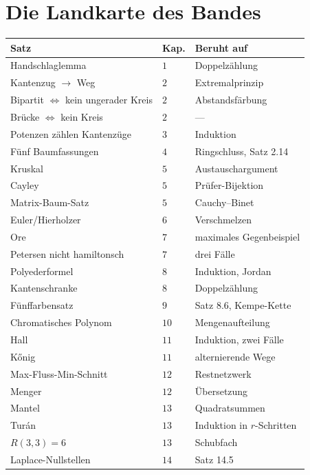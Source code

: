 \section{Die Landkarte des Bandes}

\begin{merksatz}
\begin{center}
{\small
\renewcommand{\arraystretch}{1.42}
\begin{tabular}{@{}P{3.4cm}P{1.4cm}P{3.4cm}@{}}
\toprule
\textbf{Satz} & \textbf{Kap.} & \textbf{Beruht auf}\\
\midrule
Handschlaglemma & $1$ & Doppelzählung\\
Kantenzug $\to$ Weg & $2$ & Extremalprinzip\\
Bipartit $\iff$ kein ungerader Kreis & $2$ & Abstandsfärbung\\
Brücke $\iff$ kein Kreis & $2$ & ---\\
Potenzen zählen Kantenzüge & $3$ & Induktion\\
Fünf Baumfassungen & $4$ & Ringschluss, Satz 2.14\\
Kruskal & $5$ & Austauschargument\\
Cayley & $5$ & Prüfer-Bijektion\\
Matrix-Baum-Satz & $5$ & Cauchy--Binet\\
Euler/Hierholzer & $6$ & Verschmelzen\\
Ore & $7$ & maximales Gegenbeispiel\\
Petersen nicht hamiltonsch & $7$ & drei Fälle\\
Polyederformel & $8$ & Induktion, Jordan\\
Kantenschranke & $8$ & Doppelzählung\\
Fünffarbensatz & $9$ & Satz 8.6, Kempe-Kette\\
Chromatisches Polynom & $10$ & Mengenaufteilung\\
Hall & $11$ & Induktion, zwei Fälle\\
Kőnig & $11$ & alternierende Wege\\
Max-Fluss-Min-Schnitt & $12$ & Restnetzwerk\\
Menger & $12$ & Übersetzung\\
Mantel & $13$ & Quadratsummen\\
Turán & $13$ & Induktion in $r$-Schritten\\
$R(3,3)=6$ & $13$ & Schubfach\\
Laplace-Nullstellen & $14$ & Satz 14.5\\
\bottomrule
\end{tabular}}
\end{center}
\end{merksatz}

